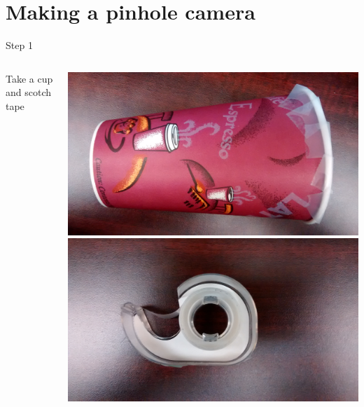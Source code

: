 \section{Making a pinhole camera}
\frame{\tableofcontents[currentsection]}
\begin{frame}{Step 1}
  \begin{columns}
    \begin{column}{0.4\textwidth}
      Take a cup and scotch tape
    \end{column}
    \begin{column}{0.6\textwidth}
      \includegraphics[width=\textwidth]{media/cup.jpg}\\
      \includegraphics[width=\textwidth]{media/tape.jpg}
    \end{column}
  \end{columns}
\end{frame}

